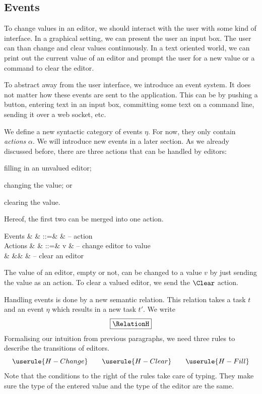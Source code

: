 \subsection{Events}

To change values in an editor,
we should interact with the user with some kind of interface.
In a graphical setting,
we can present the user an input box.
The user can than change and clear values continuously.
In a text oriented world,
we can print out the current value of an editor
and prompt the user for a new value
or a command to clear the editor.

To abstract away from the user interface,
we introduce an event system.
It does not matter how these events are sent to the application.
This can be by pushing a button,
entering text in an input box,
committing some text on a command line,
sending it over a web socket,
etc.

We define a new syntactic category of events $\eta$.
For now, they only contain \emph{actions} $\alpha$.
We will introduce new events in a later section.
As we already discussed before,
there are three actions that can be handled by editors:
\begin{enumerate*}
  \item filling in an unvalued editor;
  \item changing the value; or
  \item clearing the value.
\end{enumerate*}
Hereof, the first two can be merged into one action.
\begin{grammar}
  Events
    & \eta   & ::=& \alpha & – action \\
  Actions
    & \alpha & ::=& v      & – change editor to value \\
    &        &\mid& \Clear & – clear an editor \\
\end{grammar}
The value of an editor, empty or not, can be changed to a value $v$ by just sending the value as an action.
To clear a valued editor, we send the $\Clear$ action.

Handling events is done by a new semantic relation.
This relation takes a task $t$ and an event $\eta$ which results in a new task $t'$.
We write
\begin{equation*}
  \boxed{\RelationH}
\end{equation*}
Formalising our intuition from previous paragraphs,
we need three rules to describe the transitions of editors.
\begin{equation*}
  \userule{H-Change} \qquad \userule{H-Clear} \qquad \userule{H-Fill}
\end{equation*}
Note that the conditions to the right of the rules take care of typing.
They make sure the type of the entered value and the type of the editor are the same.



